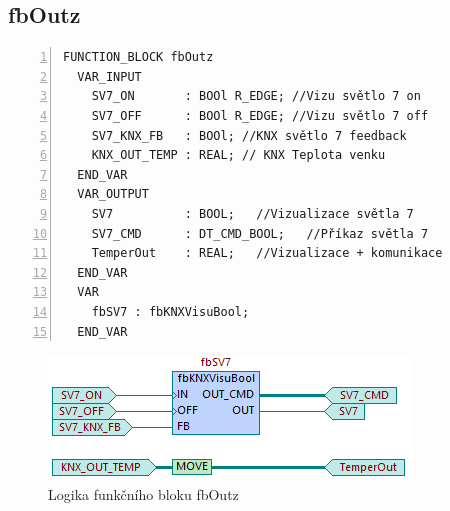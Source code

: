 \subsection{fbOutz}
\label{apend:fbOutz}
\begin{lstlisting}[language=ST, breaklines=true, numbers=left, numberstyle=\small, numbersep=10pt, frame=single, basicstyle=\ttfamily\small, caption={fbOutz}, label={lst:fbOutz}]
  FUNCTION_BLOCK fbOutz
  VAR_INPUT
    SV7_ON       : BOOl R_EDGE; //Vizu světlo 7 on
    SV7_OFF      : BOOl R_EDGE; //Vizu světlo 7 off
    SV7_KNX_FB   : BOOl; //KNX světlo 7 feedback
    KNX_OUT_TEMP : REAL; // KNX Teplota venku
  END_VAR
  VAR_OUTPUT
    SV7          : BOOL;   //Vizualizace světla 7
    SV7_CMD      : DT_CMD_BOOL;   //Příkaz světla 7
    TemperOut    : REAL;   //Vizualizace + komunikace
  END_VAR
  VAR
    fbSV7 : fbKNXVisuBool;
  END_VAR
\end{lstlisting}
\begin{figure}[!ht]
  \begin{center}
  \includegraphics[scale=1.0]{obrazky/fbOutz.png}
  \end{center}
  \caption[Logika funkčního bloku fbOutz]{Logika funkčního bloku fbOutz}
  \label{fig:fbOutz}
\end{figure}
\pagebreak
